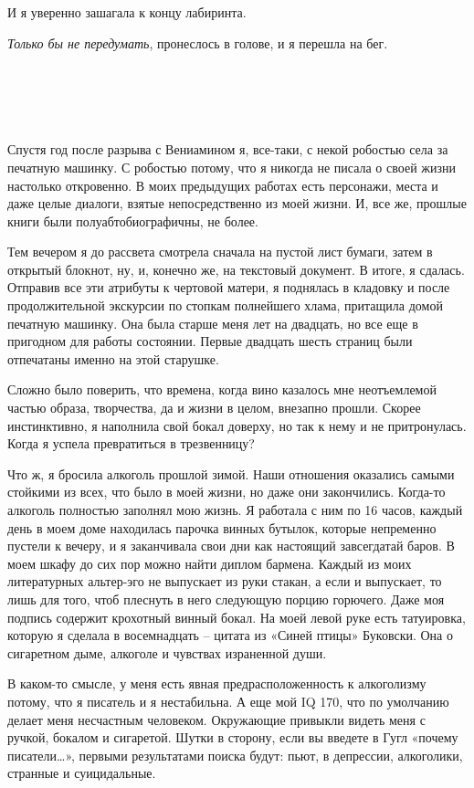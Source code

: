 \documentclass[
]{book}
\begin{document}
И я уверенно зашагала к концу лабиринта.

\emph{Только бы не передумать}, пронеслось в голове, и я перешла на бег.

\hypertarget{chapter-100}{%
\chapter{~}\label{chapter-100}}

Спустя год после разрыва с Вениамином я, все-таки, с некой робостью села за печатную машинку. С робостью потому, что я никогда не писала о своей жизни настолько откровенно. В моих предыдущих работах есть персонажи, места и даже целые диалоги, взятые непосредственно из моей жизни. И, все же, прошлые книги были полуабтобиографичны, не более.

Тем вечером я до рассвета смотрела сначала на пустой лист бумаги, затем в открытый блокнот, ну, и, конечно же, на текстовый документ. В итоге, я сдалась. Отправив все эти атрибуты к чертовой матери, я поднялась в кладовку и после продолжительной экскурсии по стопкам полнейшего хлама, притащила домой печатную машинку. Она была старше меня лет на двадцать, но все еще в пригодном для работы состоянии. Первые двадцать шесть страниц были отпечатаны именно на этой старушке.

Сложно было поверить, что времена, когда вино казалось мне неотъемлемой частью образа, творчества, да и жизни в целом, внезапно прошли. Скорее инстинктивно, я наполнила свой бокал доверху, но так к нему и не притронулась. Когда я успела превратиться в трезвенницу?

Что ж, я бросила алкоголь прошлой зимой. Наши отношения оказались самыми стойкими из всех, что было в моей жизни, но даже они закончились. Когда-то алкоголь полностью заполнял мою жизнь. Я работала с ним по 16 часов, каждый день в моем доме находилась парочка винных бутылок, которые непременно пустели к вечеру, и я заканчивала свои дни как настоящий завсегдатай баров. В моем шкафу до сих пор можно найти диплом бармена. Каждый из моих литературных альтер-эго не выпускает из руки стакан, а если и выпускает, то лишь для того, чтоб плеснуть в него следующую порцию горючего. Даже моя подпись содержит крохотный винный бокал. На моей левой руке есть татуировка, которую я сделала в восемнадцать -- цитата из «Синей птицы» Буковски. Она о сигаретном дыме, алкоголе и чувствах израненной души.

В каком-то смысле, у меня есть явная предрасположенность к алкоголизму потому, что я писатель и я нестабильна. А еще мой IQ 170, что по умолчанию делает меня несчастным человеком. Окружающие привыкли видеть меня с ручкой, бокалом и сигаретой. Шутки в сторону, если вы введете в Гугл «почему писатели\ldots», первыми результатами поиска будут: пьют, в депрессии, алкоголики, странные и суицидальные.
\end{document}
